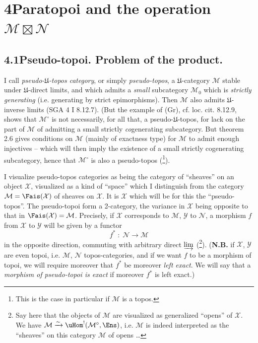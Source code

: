 

\section*{4\quad Paratopoi and the operation $\mathcal{M}\boxtimes\mathcal{N}$}

\subsection*{4.1\quad Pseudo-topoi. Problem of the product.}

I call \textit{pseudo-$\mathfrak{U}$-topos category}, or simply \textit{pseudo-topos}, a $\mathfrak{U}$-category $\mathcal{M}$ stable under $\mathfrak{U}$-direct limits, and which admits a \textit{small} subcategory $\mathcal{M}_0$ which is \textit{strictly generating} (i.e. generating by strict epimorphisms). Then $\mathcal{M}$ also admits $\mathfrak{U}$-inverse limits (SGA 4 I 8.12.7). (But the example of (Gr), cf. loc. cit. 8.12.9, shows that $\mathcal{M}^\circ$ is not necessarily, for all that, a pseudo-$\mathfrak{U}$-topos, for lack on the part of $\mathcal{M}$ of admitting a small strictly \textit{co}generating subcategory. But theorem 2.6 gives conditions on $\mathcal{M}$ (mainly of exactness type) %
for $\mathcal{M}$ to admit enough injectives -- which will then imply the existence of a small strictly cogenerating subcategory, hence that $\mathcal{M}^\circ$ is also a pseudo-topos (\footnote{This is the case in particular if $\mathcal{M}$ is a topos.}).

I visualize pseudo-topos categories as being the category of ``sheaves'' on an object $\mathcal{X}$, visualized as a kind of ``space'' which I distinguish from the category $\mathcal{M}=\Fais(\mathcal{X})$ of sheaves on $\mathcal{X}$. It is $\mathcal{X}$ which will be for this the ``pseudo-topos''. The pseudo-topoi form a 2-category, the variance in $\mathcal{X}$ being opposite to that in $\Fais(\mathcal{X})=\mathcal{M}$. Precisely, if $\mathcal{X}$ corresponds to $\mathcal{M}$, $\mathcal{Y}$ to $\mathcal{N}$, a morphism $f$ from $\mathcal{X}$ to $\mathcal{Y}$ will be given by a functor
\[
f^* \;:\; \mathcal{N} \longrightarrow \mathcal{M}
\tag*{(4.1.1)}
\]
in the opposite direction, commuting with arbitrary direct $\varinjlim$ (\footnote{Say here that the objects of $\mathcal{M}$ are visualized as generalized ``opens'' of $\mathcal{X}$. We have $\mathcal{M}\xrightarrow{\sim}\uHom^!(\mathcal{M}^\circ,\Ens)$, i.e. $\mathcal{M}$ is indeed interpreted as the ``sheaves'' on this category $\mathcal{M}$ of opens \ldots}). (\textbf{N.B.} if $\mathcal{X}$, $\mathcal{Y}$ are even topoi, i.e. $\mathcal{M}$, $\mathcal{N}$ topos-categories, and if we want $f$ to be a morphism of topoi, we will require moreover that $f^*$ be moreover \textit{left exact}. We will say that a \textit{morphism of pseudo-topoi is exact} if moreover $f^*$ is left exact.)

